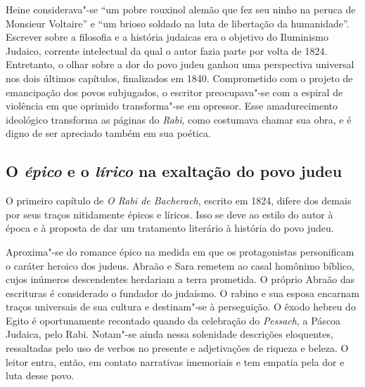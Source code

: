 \documentclass[12pt]{extarticle}
\begin{document}


Heine considerava"-se ``um pobre rouxinol alemão que fez seu ninho na
peruca de Monsieur Voltaire'' e ``um brioso soldado na luta de
libertação da humanidade''. Escrever sobre a filosofia e a história
judaicas era o objetivo do Iluminismo Judaico, corrente intelectual da
qual o autor fazia parte por volta de 1824. Entretanto, o olhar sobre a
dor do povo judeu ganhou uma perspectiva universal nos dois últimos
capítulos, finalizados em 1840. Comprometido com o projeto de
emancipação dos povos subjugados, o escritor preocupava"-se com a espiral
de violência em que oprimido transforma"-se em opressor. Esse
amadurecimento ideológico transforma as páginas do \emph{Rabi}, como costumava
chamar sua obra, e é digno de ser apreciado também em sua poética.





\subsection{O \emph{épico} e o \emph{lírico} na exaltação do povo judeu}

O primeiro capítulo de \emph{O Rabi de Bacherach}, escrito em 1824, difere dos
demais por seus traços nitidamente épicos e líricos. Isso se deve ao
estilo do autor à época e à proposta de dar um tratamento literário à
história do povo judeu.

Aproxima"-se do romance épico na medida em que os protagonistas
personificam o caráter heroico dos judeus. Abraão e Sara remetem ao
casal homônimo bíblico, cujos inúmeros descendentes herdariam a terra
prometida. O próprio Abraão das escrituras é considerado o fundador do
judaísmo. O rabino e sua esposa encarnam traços universais de sua
cultura e destinam"-se à perseguição. O êxodo hebreu do Egito é
oportunamente recontado quando da celebração do \emph{Pessach}, a Páscoa Judaica, pelo
Rabi. Notam"-se ainda nessa solenidade descrições eloquentes, ressaltadas
pelo uso de verbos no presente e adjetivações de riqueza e beleza. O
leitor entra, então, em contato narrativas imemoriais e tem empatia pela
dor e luta desse povo.


\end{document}
